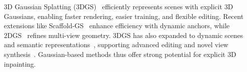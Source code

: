 \vspace{3pt}
3D Gaussian Splatting (3DGS)~\cite{kerbl20233d} efficiently represents scenes with explicit 3D Gaussians, enabling faster rendering, easier training, and flexible editing\citep{chen2024gaussianeditor}. Recent extensions like Scaffold-GS~\citep{scaffoldgs} enhance efficiency with dynamic anchors, while 2DGS~\citep{huang20242d} refines multi-view geometry. 3DGS has also expanded to dynamic scenes~\citep{yang2024deformable, luiten2023dynamic, Wu_2024_CVPR,fan2025spectromotion} and semantic representations~\citep{ye2023gaussian, qin2023langsplat}, supporting advanced editing and novel view synthesis~\citep{qiu-2024-featuresplatting, huang20242d}. Gaussian-based methods thus offer strong potential for explicit 3D inpainting.


